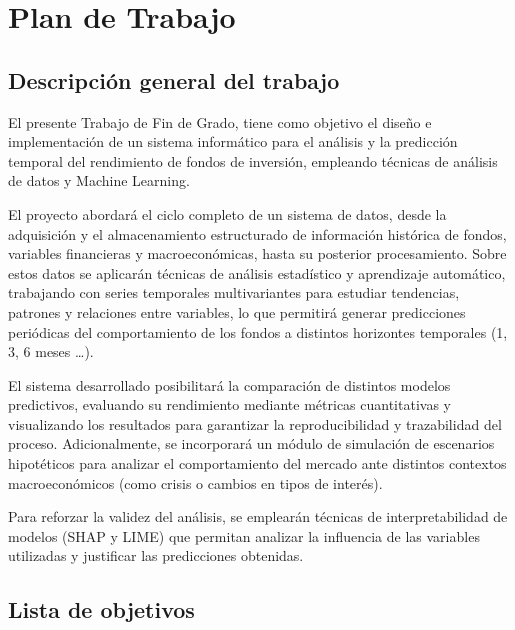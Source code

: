 \section*{Plan de Trabajo}

\subsection*{Descripción general del trabajo}

El presente Trabajo de Fin de Grado, tiene como objetivo el diseño e implementación de un sistema informático para el análisis y la predicción temporal del rendimiento de fondos de inversión, empleando técnicas de análisis de datos y Machine Learning. 

El proyecto abordará el ciclo completo de un sistema de datos, desde la adquisición y el almacenamiento estructurado de información histórica de fondos, variables financieras y macroeconómicas, hasta su posterior procesamiento. Sobre estos datos se aplicarán técnicas de análisis estadístico y aprendizaje automático, trabajando con series temporales multivariantes para estudiar tendencias, patrones y relaciones entre variables, lo que permitirá generar predicciones periódicas del comportamiento de los fondos a distintos horizontes temporales (1, 3, 6 meses …). 

El sistema desarrollado posibilitará la comparación de distintos modelos predictivos, evaluando su rendimiento mediante métricas cuantitativas y visualizando los resultados para garantizar la reproducibilidad y trazabilidad del proceso. Adicionalmente, se incorporará un módulo de simulación de escenarios hipotéticos para analizar el comportamiento del mercado ante distintos contextos macroeconómicos (como crisis o cambios en tipos de interés). 

Para reforzar la validez del análisis, se emplearán técnicas de interpretabilidad de modelos (SHAP y LIME) que permitan analizar la influencia de las variables utilizadas y justificar las predicciones obtenidas.

\subsection*{Lista de objetivos}

